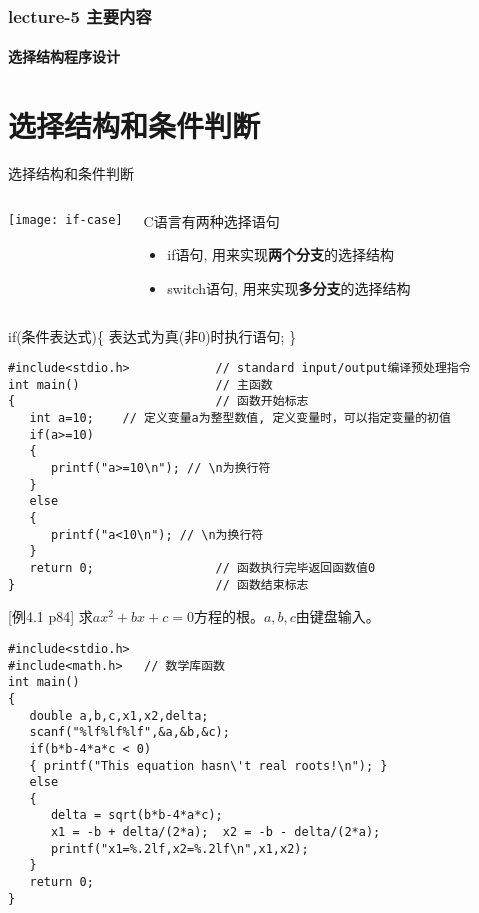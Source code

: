 \begin{frame}[shrink]
  \frametitle{lecture-5 主要内容}
  \framesubtitle{选择结构程序设计}
  \tableofcontents[hideallsubsections]
\end{frame}

\section{选择结构和条件判断}

\begin{frame}{选择结构和条件判断}
\begin{columns}
	\texttt{[image: if-case]}
	\begin{block}{C语言有两种选择语句}
		\begin{itemize}
			\item if语句, 用来实现\textbf{两个分支}的选择结构
			\item switch语句, 用来实现\textbf{多分支}的选择结构
		\end{itemize}
	\end{block}
\end{columns}
\end{frame}

\begin{frame}[fragile]{if(条件表达式)\{ 表达式为真(非0)时执行语句; \}}
\begin{lstlisting}
#include<stdio.h>            // standard input/output编译预处理指令
int main()                   // 主函数
{                            // 函数开始标志
   int a=10;    // 定义变量a为整型数值, 定义变量时，可以指定变量的初值
   if(a>=10)
   {
      printf("a>=10\n"); // \n为换行符
   }
   else
   {
      printf("a<10\n"); // \n为换行符
   }
   return 0;                 // 函数执行完毕返回函数值0
}                            // 函数结束标志
\end{lstlisting}
\end{frame}

\begin{frame}
\small [例4.1 p84] 求$ax^2+bx+c=0$方程的根。$a,b,c$由键盘输入。
\begin{lstlisting}
#include<stdio.h>
#include<math.h>   // 数学库函数        
int main()                   
{  
   double a,b,c,x1,x2,delta;
   scanf("%lf%lf%lf",&a,&b,&c);
   if(b*b-4*a*c < 0) 
   { printf("This equation hasn\'t real roots!\n"); }
   else
   {
      delta = sqrt(b*b-4*a*c);
      x1 = -b + delta/(2*a);  x2 = -b - delta/(2*a);
      printf("x1=%.2lf,x2=%.2lf\n",x1,x2);
   }
   return 0;           
}                            
\end{lstlisting}
\end{frame}

